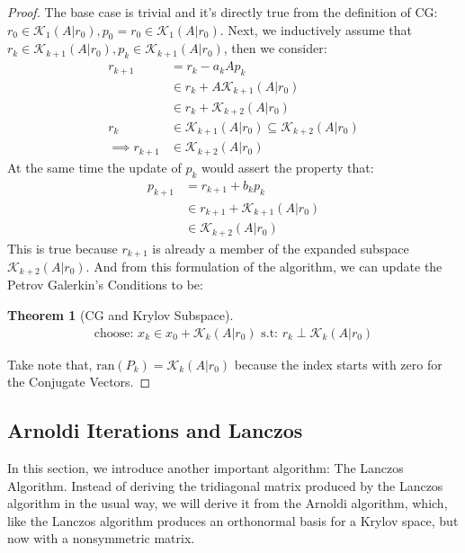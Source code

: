 \documentclass[]{article}
\theoremstyle{definition}
\newtheorem{theorem}{Theorem}            %
\begin{document}
            \begin{proof}
                The base case is trivial and it's directly true from the definition of CG: $r_0 \in \mathcal K_1(A|r_0), p_0 = r_0 \in \mathcal K_1(A|r_0)$. Next, we inductively assume that $r_k \in \mathcal K_{k + 1}(A|r_0), p_k \in \mathcal K_{k + 1}(A|r_0)$, then we consider: 
                \begin{align}
                    r_{k + 1} &= r_k - a_kAp_k
                    \\
                    &\in r_k + A\mathcal K_{k + 1}(A|r_0)
                    \\
                    &\in r_k + \mathcal K_{k + 2}(A|r_0)
                    \\
                    r_k 
                    &\in 
                    \mathcal K_{k + 1}(A|r_0) \subseteq \mathcal K_{k + 2}(A|r_0)
                    \\
                    \implies r_{k + 1}
                    &\in 
                    \mathcal K_{k + 2}(A|r_0)
                \end{align}
                At the same time the update of $p_k$ would assert the property that: 
                \begin{align}
                    p_{k + 1} &= r_{k + 1} + b_kp_k
                    \\
                    &\in 
                    r_{k + 1} + \mathcal K_{k + 1}(A|r_0)
                    \\
                    &\in \mathcal K_{k + 2}(A|r_0)
                \end{align}
                This is true because $r_{k + 1}$ is already a member of the expanded subspace $\mathcal K_{k + 2}(A|r_0)$. And from this formulation of the algorithm, we can update the Petrov Galerkin's Conditions to be: 
                \begin{theorem}[CG and Krylov Subspace]\label{theorem:CG_and_Krylov_Subspace}
                    \begin{align}
                        \text{choose: } x_k\in x_0 + \mathcal K_{k}(A|r_0) \text{ s.t: } r_k \perp \mathcal K_{k}(A|r_0)
                    \end{align}    
                \end{theorem}
                Take note that, $\text{ran}(P_k) = \mathcal K_k(A|r_0)$ because the index starts with zero for the Conjugate Vectors.
            \end{proof}
    \subsection{Arnoldi Iterations and Lanczos}
        In this section, we introduce another important algorithm: The Lanczos Algorithm.  Instead of deriving the tridiagonal matrix produced by the Lanczos algorithm in the usual way, we will derive it from the Arnoldi algorithm, which, like the Lanczos algorithm produces an orthonormal basis for a Krylov space, but now with a nonsymmetric matrix.
\end{document}
